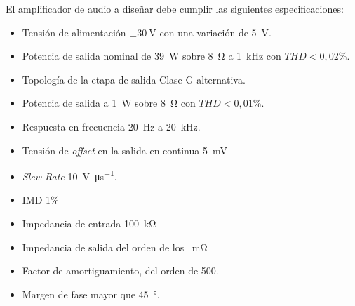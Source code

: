 El amplificador de audio a diseñar debe cumplir las siguientes especificaciones:

\begin{itemize}
	\item Tensión de alimentación $\pm \SI{30}{\volt}$ con una variación de \SI{5}{\volt}.
	\item Potencia de salida nominal de \SI{39}{\watt} sobre \SI{8}{\ohm} a \SI{1}{\kilo\hertz} con $THD<0,02\%$.
	\item Topología de la etapa de salida Clase G alternativa.
	\item Potencia de salida a \SI{1}{\watt} sobre \SI{8}{\ohm} con $THD<0,01\%$. 
	\item Respuesta en frecuencia \SI{20}{\hertz} a \SI{20}{\kilo\hertz}.
	\item Tensión de \textit{offset} en la salida en continua \SI{5}{\milli\volt}
	\item \textit{Slew Rate} \SI{10}{\volt\per\micro\second}.
	\item IMD 1\%
	\item Impedancia de entrada \SI{100}{\kilo\ohm}
	\item Impedancia de salida del orden de los \SI{}{\milli\ohm}
	\item Factor de amortiguamiento, del orden de 500.
	\item Margen de fase mayor que \SI{45}{\degree}.
\end{itemize}
